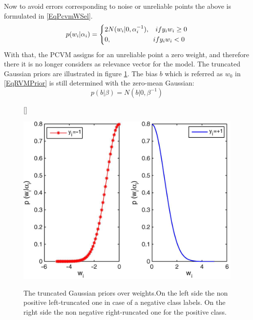Now to avoid errors corresponding to noise or unreliable points the above is formulated in \eqref{EqPcvmWSel}.\cite{Chen.2009}
\begin{equation}\label{EqPcvmWSel}
	p(w_i \vert \alpha_i) =
	\begin{dcases*}
		2N(w_i \vert 0,\alpha_i^{-1} ),\>\>\>\>  if y_i w_i \ge 0\\
		0				,\>\>\>\>\>\>\>\>\>\>\>\>\>\>\>\>\>\>\>\>\>\>\>\>\>\>\>\> if y_i w_i<0
	\end{dcases*}
\end{equation}
With that, the \acs{PCVM} assigns for an unreliable point a zero weight, and therefore there it is no longer considers as relevance vector for the model.
The truncated Gaussian priors are illustrated in figure \ref{FigTruncGaus}.\newline
The bias $b$ which is referred as $w_0$ in \eqref{EqRVMPrior} is still determined with the zero-mean Gaussian:\cite{Chen.2009}
\begin{equation}\label{EqPcvmBPrior}
p(b \vert \beta) = N(b \vert 0, \beta^{-1})
\end{equation}
\begin{figure}
	\centering
	[\FBwidth]
	{\caption[Truncated Gaussian Priors over Weights]{The truncated Gaussian priors over weights.On the left side the non positive left-truncated one in case of a negative class labels. On the right side the non negative right-runcated one for the positive class.\cite{Chen.2009}}}
	{\includegraphics[width=\linewidth]{figures/TuncatedGaussian.png}\label{FigTruncGaus}}
\end{figure}
